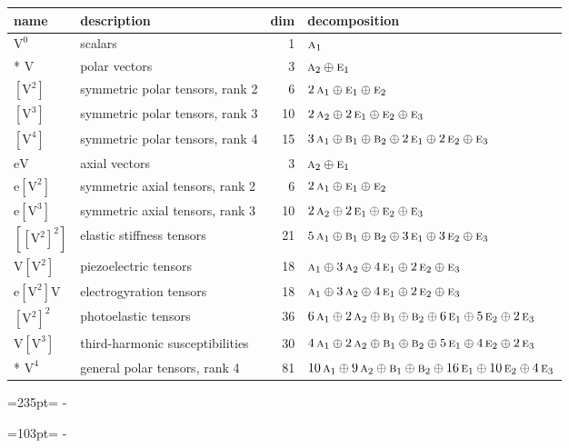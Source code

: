 \documentclass[10pt,a4paper]{article}
\newcommand{\needspace}[1]{\par\penalty-100\begingroup\dimen0=#1\relax\dimen2=\pagegoal
  \advance\dimen2-\pagetotal\ifdim\dimen0>\dimen2\relax\ifdim\dimen2>0pt\vfil\break\fi\fi
  \endgroup}
\numberwithin{equation}{section}
\newcommand{\irr}[1]{\text{\normalfont\scshape #1}}
\newcommand{\jahn}[1]{\mathrm{#1}}
\newlength{\fillwidth}\newlength{\cellwidth}\newlength{\colwidth}
\begin{document}
{\begin{longtable}{@{}llr>{\RaggedRight\arraybackslash}p{\fillwidth}@{}}
name & description & dim & decomposition\\\midrule\endhead
\bottomrule\endfoot\endlastfoot
$\jahn{V^{0}}$ & scalars & 1 & $\irr{a}_{1}$\\*
$\jahn{V}$ & polar vectors & 3 & $\irr{a}_{2} \oplus\allowbreak \irr{e}_{1}$\\
$\jahn{[V^{2}]}$ & symmetric polar tensors, rank 2 & 6 & $2\,\irr{a}_{1} \oplus\allowbreak \irr{e}_{1} \oplus\allowbreak \irr{e}_{2}$\\
$\jahn{[V^{3}]}$ & symmetric polar tensors, rank 3 & 10 & $2\,\irr{a}_{2} \oplus\allowbreak 2\,\irr{e}_{1} \oplus\allowbreak \irr{e}_{2} \oplus\allowbreak \irr{e}_{3}$\\
$\jahn{[V^{4}]}$ & symmetric polar tensors, rank 4 & 15 & $3\,\irr{a}_{1} \oplus\allowbreak \irr{b}_{1} \oplus\allowbreak \irr{b}_{2} \oplus\allowbreak 2\,\irr{e}_{1} \oplus\allowbreak 2\,\irr{e}_{2} \oplus\allowbreak \irr{e}_{3}$\\
$\jahn{eV}$ & axial vectors & 3 & $\irr{a}_{2} \oplus\allowbreak \irr{e}_{1}$\\
$\jahn{e[V^{2}]}$ & symmetric axial tensors, rank 2 & 6 & $2\,\irr{a}_{1} \oplus\allowbreak \irr{e}_{1} \oplus\allowbreak \irr{e}_{2}$\\
$\jahn{e[V^{3}]}$ & symmetric axial tensors, rank 3 & 10 & $2\,\irr{a}_{2} \oplus\allowbreak 2\,\irr{e}_{1} \oplus\allowbreak \irr{e}_{2} \oplus\allowbreak \irr{e}_{3}$\\
$\jahn{[[V^{2}]^{2}]}$ & elastic stiffness tensors & 21 & $5\,\irr{a}_{1} \oplus\allowbreak \irr{b}_{1} \oplus\allowbreak \irr{b}_{2} \oplus\allowbreak 3\,\irr{e}_{1} \oplus\allowbreak 3\,\irr{e}_{2} \oplus\allowbreak \irr{e}_{3}$\\
$\jahn{V[V^{2}]}$ & piezoelectric tensors & 18 & $\irr{a}_{1} \oplus\allowbreak 3\,\irr{a}_{2} \oplus\allowbreak 4\,\irr{e}_{1} \oplus\allowbreak 2\,\irr{e}_{2} \oplus\allowbreak \irr{e}_{3}$\\
$\jahn{e[V^{2}]V}$ & electrogyration tensors & 18 & $\irr{a}_{1} \oplus\allowbreak 3\,\irr{a}_{2} \oplus\allowbreak 4\,\irr{e}_{1} \oplus\allowbreak 2\,\irr{e}_{2} \oplus\allowbreak \irr{e}_{3}$\\
$\jahn{[V^{2}]^{2}}$ & photoelastic tensors & 36 & $6\,\irr{a}_{1} \oplus\allowbreak 2\,\irr{a}_{2} \oplus\allowbreak \irr{b}_{1} \oplus\allowbreak \irr{b}_{2} \oplus\allowbreak 6\,\irr{e}_{1} \oplus\allowbreak 5\,\irr{e}_{2} \oplus\allowbreak 2\,\irr{e}_{3}$\\
$\jahn{V[V^{3}]}$ & third-harmonic susceptibilities & 30 & $4\,\irr{a}_{1} \oplus\allowbreak 2\,\irr{a}_{2} \oplus\allowbreak \irr{b}_{1} \oplus\allowbreak \irr{b}_{2} \oplus\allowbreak 5\,\irr{e}_{1} \oplus\allowbreak 4\,\irr{e}_{2} \oplus\allowbreak 2\,\irr{e}_{3}$\\*
$\jahn{V^{4}}$ & general polar tensors, rank 4 & 81 & $10\,\irr{a}_{1} \oplus\allowbreak 9\,\irr{a}_{2} \oplus\allowbreak \irr{b}_{1} \oplus\allowbreak \irr{b}_{2} \oplus\allowbreak 16\,\irr{e}_{1} \oplus\allowbreak 10\,\irr{e}_{2} \oplus\allowbreak 4\,\irr{e}_{3}$\\
\bottomrule\end{longtable}}
\needspace{235pt}
\needspace{103pt}
\end{document}
